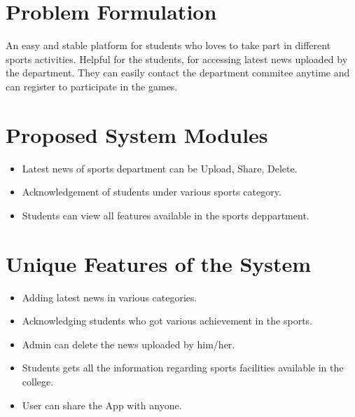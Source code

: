 \section{Problem Formulation}
An easy and stable platform for students who loves to take part in different sports activities. Helpful for the students, for accessing latest news uploaded by the department. They can easily contact the department commitee anytime and can register to participate in the games. 

\section{Proposed System Modules}

\begin{itemize}
	\item Latest news of sports department can be Upload, Share, Delete.

	\item Acknowledgement of students under various sports category.
	
	\item Students can view all features available in the sports deppartment.   
	
	
	


\end{itemize}

 
\section{Unique Features of the System}
\begin{itemize}

\item Adding latest news in various categories.
\item Acknowledging students who got various achievement in the sports.
\item Admin can delete the news uploaded by him/her.

\item Students gets all the information regarding sports facilities available in the college.
\item User can share the App with anyone.
\end{itemize}


